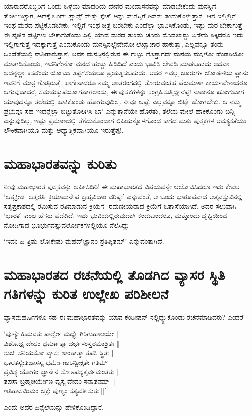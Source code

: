 ಯಾರಾದರೊಬ್ಬರಿಗೆ ಒಂದು ಒಳ್ಳೆಯ ಮಾದರಿಯ ದೇವರ ಮಂದಾಸನವನ್ನು ಮಾಡಬೇಕೆಂದು ಮನಸ್ಸಿಗೆ ತೋರಿಬಿಟ್ಟಾಗ, ಅದಕ್ಕೆ ಒಂದು ಪ್ಲಾನ್ೞ್ ಮತ್ತು ಸ್ಕೆಚ್ ಅನ್ನು ಮನಸ್ಸಿಗೆ ಅವನು ತಂದುಕೊಳ್ಳುತ್ತಾನೆ. ಆಗ ಇಲ್ಲಿಲ್ಲಿಗೆ ಇಂಥ ಮರದ ಪಟ್ಟಿಕೊಡಬೇಕು, ಇಲ್ಲಿಗೆ ಇಂಥ ಚಿತ್ರ ಬರಬೇಕು ಎಂದೆಲ್ಲಾ ಭಾವಿಸಿಕೊಂಡು, ಇಷ್ಟು ಮರ ಬೇಕಾಗುತ್ತೆ ಈ ಸೈಜಿನ ಪಟ್ಟಿಗಳು ಬೇಕಾಗುತ್ತೆಂದು ಎಲ್ಲಿ ಯಾವ ಮರದ ತುಂಡು ಚೂರು ಮೊದಲಾದ್ದು ಏನೇನು ಸಿಕ್ಕಿದರೂ ಇದು ಇಲ್ಲಿಗಾಗುತ್ತೆ ಇದಕ್ಕಾಗುತ್ತೆ ಎಂದುಕೊಂಡು ಮನಸ್ಸಿನಲ್ಲೇನೇನೋ ಲೆಖ್ಖಾಚಾರ ಹಾಕುತ್ತಾ, ಎಲ್ಲವನ್ನೂ ತಂದು ಒಂದೆಡೆಯಲ್ಲಿ ರಾಶಿಹಾಕುತ್ತಾನೆ. ಅವನ ಮನಸ್ಸಿನಲ್ಲಿರುವ ಈ ಗುಟ್ಟು ಗೊತ್ತಾಗದೇ ಮನೆಯ ಮಕ್ಕಳೋ ಹೆಂಡತಿಯೋ ಮಾತಾಡಿಕೊಂಡು, ಇವನಿಗೇನೋ ಮರದ ಹುಚ್ಚು ಹಿಡಿದಿದೆ ಎಂದು ಭಾವಿಸಿ ಲೇವಡಿ ಮಾಡಬಹುದು ಅಥವಾ ಅದನ್ನೆಲ್ಲಾ ಕಸವೆಂದು ಯೋಚಿಸಿ ತಿಪ್ಪೆಗೆಸೆಯಲೂ ಪ್ರಯತ್ನಿಸಬಹುದು. ಆದರೆ ಇವೆಲ್ಲ ಚೂರುಗಳ ಜೋಡಣೆಯ ಪ್ಲಾನು ಇವನಿಗೆ ಮಾತ್ರ ಗೊತ್ತಿರುತ್ತೆ. ಹಾಗೇನಾದರೂ ನಮ್ಮ ಅಂತರಂಗದಲ್ಲಿ ತೋರುವಂತಹ ಪೆರುಮಾಳ್ ಕಾರ್ಯವೇನಾದರೂ ಆಗುವುದಾದರೆ, ಸಮಯಕ್ಕುಪಯೋಗವಾಗಲೆಂದು, ಈ ಪುಸ್ತಕಗಳನ್ನು ಸಂಗ್ರಹಿಸುತ್ತಿದ್ದೇನೆಪ್ಪ! ನಾವೇನೂ ಹೋಗುವಾಗ ಯಾವುದನ್ನೂ ತಲೆಯಲ್ಲಿ ಹಾಕಿಕೊಂಡು ಹೋಗುವುದಿಲ್ಲ. ನೀವೂ ಅಷ್ಟೆ. ಎಲ್ಲವನ್ನೂ ಬಿಟ್ಟೇ ಹೋಗಬೇಕು. ಆ ನಮ್ಮ ಪ್ರಭುವೂ ಸಹ `ಇದನ್ನೆಲ್ಲಾ ಬಿಟ್ಟುತೊಲಗಿಸಿ ಬಾ' ಎನ್ನುತ್ತಾನೆಯೇ ಹೊರತು, ತಲೆಯ ಮೇಲೆ ಹಾಕಿಕೊಂಡು ಬನ್ನಿ ಎನ್ನುವುದಿಲ್ಲ. ಇಷ್ಟು  ಪ್ರಮಾಣದಲ್ಲಿ ತೆಗೆದುಕೊಂಡಾಗ ಲಿಪಿಯನ್ನೊಳಗೊಂಡ ಕಾಗದ ಮತ್ತು ಪುಸ್ತಕಗಳ ಆವಶ್ಯಕತೆಯು ಲೌಕಿಕವಾಗಿಯೂ ಮತ್ತು ಆಧ್ಯಾತ್ಮಿಕವಾಗಿಯೂ ಇರುತ್ತೆಪ್ಪ!.

\section*{ಮಹಾಭಾರತವನ್ನು ಕುರಿತು}

ನೀವು ಮಹಾಭಾರತ ಪುಸ್ತಕವನ್ನು ಅರ್ಪಿಸಿದಿರಿ! ಈ ಮಹಾಭಾರತದ ವಿಷಯವನ್ನೇ ಆಲೋಚಿಸಿದರೂ ಇದು ಕೇವಲ `ಆತ್ಮಕ್ರೀಡಃ ಆತ್ಮರತಿಃ\label{118} ಕ್ರಿಯಾವಾನೇಷ ಬ್ರಹ್ಮವಿದಾಂ ವರಿಷ್ಠಃ' ಎನ್ನುವಂತೆ, ಆ ಒಂದು ಭಾರೂಪವಾದ ಆತ್ಮವಸ್ತುವಿನಲ್ಲಿ ಸತ್ಯಪ್ರಕಾಶದಲ್ಲಿ ರಮಿಸುವ-ರತಿಮಾಡುವ ಕ್ರಿಯೆಗೆ- ರಮಣೀಯವಾದ ಕ್ರಿಯೆಗೆ ಒತ್ತಾಸೆಯಾಗಿದೆ. ಅದರ ಸಲುವಾಗಿ `ಭಾರತ' ಎಂಬ ಹೆಸರು ಪಡೆದಿದೆ. ಇದು ಭುವಿಯಲ್ಲಿರುವುದಾಗಿ ಕಂಡುಬಂದರೂ, ಮತ್ತೊಂದು ದೃಷ್ಟಿಯಿಂದ ನೋಡಿಗಾದ ಭೂರ್ಭುವಸ್ಸುವರ್ಲೋಕಗಳಲ್ಲಿಯೂ ನೆಲೆಸಿದ್ದು-

\begin{shloka}
`ಇದಂ ಹಿ ತ್ರಿಷು ಲೋಕೇಷು\label{118} ಮಹದ್‌ಜ್ಞಾನಂ ಪ್ರತಿಷ್ಠಿತಮ್' ಎನ್ನುವಂತಾಗಿದೆ.
\end{shloka}

\section*{ಮಹಾಭಾರತದ ರಚನೆಯಲ್ಲಿ ತೊಡಗಿದ ವ್ಯಾಸರ ಸ್ಥಿತಿ ಗತಿಗಳನ್ನು ಕುರಿತ ಉಲ್ಲೇಖ ಪರಿಶೀಲನೆ}

ವ್ಯಾಸಮಹರ್ಷಿಗಳೂ ಸಹ ಈ ಮಹಾಭಾರತವನ್ನು ಯಾವ ಕಂಡೀಷನ್ ನಲ್ಲಿದ್ದ್ದುಕೊಂಡು ರಚನೆಮಾಡಿದರು? ಎಂದರೆ-

\begin{shloka}
`ಪುಣ್ಯೇ ಹಿಮವತಃ ಪಾರ್ಶ್ವೇ ಮಧ್ಯೇ ಗಿರಿಗುಹಾಲಯೇ |\label{118}\\
ವಿಶೋಧ್ಯ ದೇಹಂ ಧರ್ಮಾತ್ಮಾ ದರ್ಭಸಂಸ್ತರಮಾಶ್ರಿತಃ ||\\
ಶುಚಿಃ ಸನಿಯಮೋ ವ್ಯಾಸಃ ಶಾಂತಾತ್ಮಾ ತಪಸಿ ಸ್ಥಿತಃ |\\
ಭಾರತಸ್ಯೇತಿಹಾಸಸ್ಯ ಧರ್ಮೇಣಾಽನ್ವೀಕ್ಷತೇ ಗತಿಮ್ ||\\
ಪ್ರವಿಶ್ಯ ಯೋಗಂ ಜ್ಞಾನೇನ ಸೋಽಪಶ್ಯತ್ಸರ್ವಮಂತತಃ |\\
ತಪಸಾ ಬ್ರಹ್ಮಚರ್ಯೇಣ ವ್ಯಸ್ಯ ವೇದಂ ಸನಾತನಮ್ ||\\
ಇತಿಹಾಸಮಿಮಂ ಚಕ್ರೇ ಪುಣ್ಯಂ ಸತ್ಯವತೀಸುತಃ ||'
\end{shloka}
ಎಂದು ಅದರ ಹಿನ್ನೆಲೆಯನ್ನು ಹೇಳಿಕೊಂಡಿದ್ದಾರೆ.

